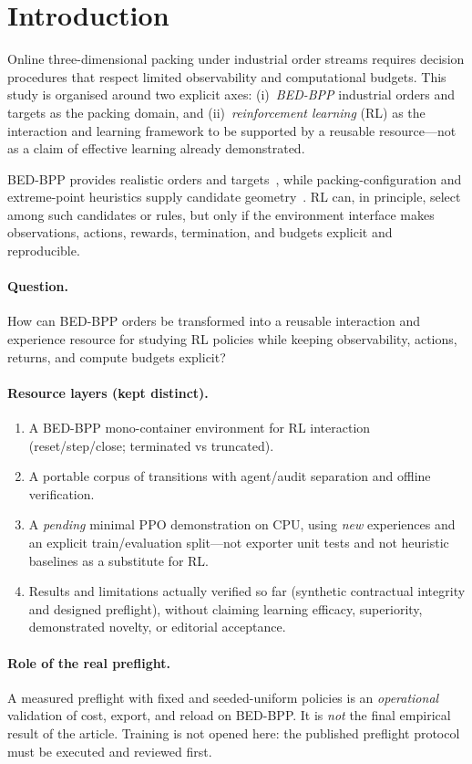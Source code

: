\section{Introduction}

Online three-dimensional packing under industrial order streams requires
decision procedures that respect limited observability and computational
budgets. This study is organised around two explicit axes:
(i)~\emph{BED-BPP} industrial orders and targets as the packing domain, and
(ii)~\emph{reinforcement learning} (RL) as the interaction and learning
framework to be supported by a reusable resource---not as a claim of effective
learning already demonstrated.

BED-BPP provides realistic orders and targets~\citep{kagerer2023bedbpp},
while packing-configuration and extreme-point heuristics supply candidate
geometry~\citep{zhao2022pct,crainic2008extreme}. RL can, in principle, select
among such candidates or rules, but only if the environment interface makes
observations, actions, rewards, termination, and budgets explicit and
reproducible.

\paragraph{Question.}
How can BED-BPP orders be transformed into a reusable interaction and experience
resource for studying RL policies while keeping observability, actions, returns,
and compute budgets explicit?

\paragraph{Resource layers (kept distinct).}
\begin{enumerate}
  \item A BED-BPP mono-container environment for RL interaction
    (reset/step/close; terminated vs truncated).
  \item A portable corpus of transitions with agent/audit separation and
    offline verification.
  \item A \emph{pending} minimal PPO demonstration on CPU, using \emph{new}
    experiences and an explicit train/evaluation split---not exporter unit
    tests and not heuristic baselines as a substitute for RL.
  \item Results and limitations actually verified so far (synthetic contractual
    integrity and designed preflight), without claiming learning efficacy,
    superiority, demonstrated novelty, or editorial acceptance.
\end{enumerate}

\paragraph{Role of the real preflight.}
A measured preflight with fixed and seeded-uniform policies is an
\emph{operational} validation of cost, export, and reload on BED-BPP. It is
\emph{not} the final empirical result of the article. Training is not opened
here: the published preflight protocol must be executed and reviewed first.
